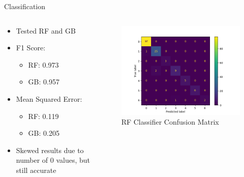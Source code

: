 \documentclass{beamer}
\begin{document}
\begin{frame}{Classification}

\begin{columns}
    \begin{column}{0.4\textwidth}
        \begin{itemize}
            \item Tested RF and GB
            \vspace{3mm}
            \item F1 Score:
            \begin{itemize}
                \item RF: 0.973
                \item GB: 0.957
            \end{itemize}
            \vspace{3mm}
            \item Mean Squared Error:
            \begin{itemize}
                \item RF: 0.119
                \item GB: 0.205
            \end{itemize}
            \vspace{3mm}
            \item Skewed results due to number of 0 values, but still accurate
        \end{itemize}
    \end{column}
    
    \begin{column}{0.7\textwidth}
         \begin{figure}
            \centering
            \includegraphics[width=1\textwidth]{img/confusion_matrix.png}
                \vspace{-8mm}
            \caption{RF Classifier Confusion  Matrix}
        \end{figure}

    \end{column}
\end{columns}

\end{frame}
\end{document}
